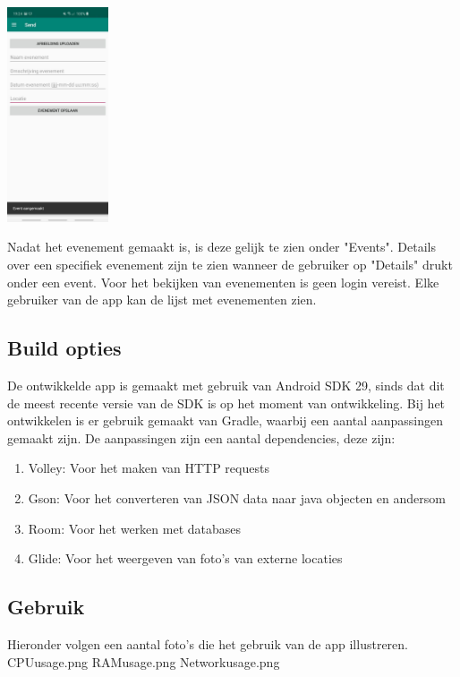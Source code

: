 \documentclass[dutch]{report}
\begin{document}
	\begin{minipage}{0.33\textwidth}
		\begin{center}
			\includegraphics[width=3cm]{images/FOTOEVENTAANGEMAAKT.jpg}
		\end{center}
	\end{minipage}
	
	Nadat het evenement gemaakt is, is deze gelijk te zien onder "Events". 
	Details over een specifiek evenement zijn te zien wanneer de gebruiker op "Details" drukt onder een event.
	Voor het bekijken van evenementen is geen login vereist. Elke gebruiker van de app kan de lijst met evenementen zien.
	
	\subsection{Build opties}
	De ontwikkelde app is gemaakt met gebruik van Android SDK 29, sinds dat dit de meest recente versie van de SDK is op het moment van ontwikkeling.
	Bij het ontwikkelen is er gebruik gemaakt van Gradle, waarbij een aantal aanpassingen gemaakt zijn. De aanpassingen zijn  een aantal dependencies, deze zijn:
	 \begin{enumerate}
	 	\item Volley: Voor het maken van HTTP requests
	 	\item Gson: Voor het converteren van JSON data naar java objecten en andersom
	 	\item Room: Voor het werken met databases
	 	\item Glide: Voor het weergeven van foto's van externe locaties
	 \end{enumerate}
 
 	\subsection{Gebruik}
 	Hieronder volgen een aantal foto's die het gebruik van de app illustreren.
 	CPUusage.png
 	RAMusage.png
 	Networkusage.png
		
\end{document}
